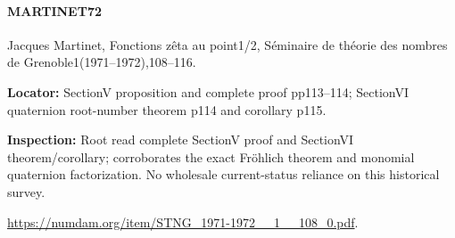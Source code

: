 \documentclass[11pt,a4paper]{article}
\begin{document}
\paragraph{MARTINET72} Jacques Martinet, Fonctions zêta au point1/\allowbreak{}2, Séminaire de théorie des nombres de Grenoble1(1971–\allowbreak{}1972),108–\allowbreak{}116.

\textbf{Locator:} SectionV proposition and complete proof pp113–\allowbreak{}114; SectionVI quaternion root-number theorem p114 and corollary p115.

\textbf{Inspection:} Root read complete SectionV proof and SectionVI theorem/\allowbreak{}corollary; corroborates the exact Fröhlich theorem and monomial quaternion factorization.\allowbreak{} No wholesale current-status reliance on this historical survey.\allowbreak{}

\url{https://numdam.org/item/STNG_1971-1972__1__108_0.pdf}.
\end{document}
